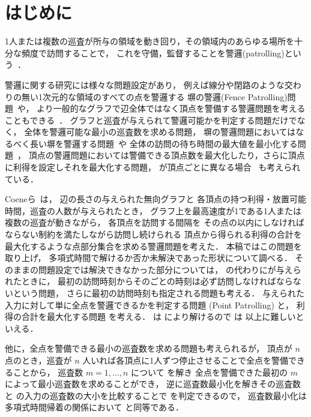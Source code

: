 
\section{はじめに}

1人または複数の巡査が所与の領域を動き回り，その領域内のあらゆる場所を十分な頻度で訪問することで，
これを守備，監督することを警邏(patrolling)という~\cite{czyzowicz2011boundary}．

警邏に関する研究には様々な問題設定があり，
例えば線分や閉路のような交わりの無い1次元的な領域のすべての点を警邏する
塀の警邏(Fence Patrolling)問題~\cite{czyzowicz2011boundary, chen2013fence}や，
より一般的なグラフで辺全体ではなく頂点を警備する警邏問題を考えることもできる~\cite{coene2011charlemagne}．
グラフと巡査が与えられて警邏可能かを判定する問題だけでなく，
全体を警邏可能な最小の巡査数を求める問題，
塀の警邏問題においてはなるべく長い塀を警邏する問題~\cite{czyzowicz2011boundary}や
全体の訪問の待ち時間の最大値を最小化する問題~\cite{chen2013fence}，
頂点の警邏問題においては警備できる頂点数を最大化したり，さらに頂点に利得を設定しそれを最大化する問題，
{\timelimit}が頂点ごとに異なる場合~\cite{coene2011charlemagne}
も考えられている．

Coeneら~\cite{coene2011charlemagne}は，
辺の長さの与えられた無向グラフと
各頂点の持つ利得・放置可能時間，巡査の人数が与えられたとき，
グラフ上を最高速度が1である1人または複数の巡査が動きながら，
各頂点を訪問する間隔を
その点の{\timelimit}以内にしなければならない制約を満たしながら訪問し続けられる
頂点から得られる利得の合計を最大化するような点部分集合を求める警邏問題を考えた．
本稿ではこの問題を取り上げ，
多項式時間で解けるか否か未解決であった形状について調べる．
そのままの問題設定では解決できなかった部分については，
{\timelimit}の代わりに{\period}が与えられたときに，
最初の訪問時刻からその{\period}ごとの時刻は必ず訪問しなければならないという問題，
さらに最初の訪問時刻も指定される問題も考える．
与えられた入力に対して単に全点を警邏できるかを判定する問題 \decisionpp (Point Patrolling) と，
利得の合計を最大化する問題 \optpp を考える．
\decisionpp は \optpp により解けるので \optpp は \decisionpp 以上に難しいといえる．

他に，全点を警備できる最小の巡査数を求める問題も考えられるが，
頂点が $n$ 点のとき，巡査が $n$ 人いれば各頂点に1人ずつ停止させることで全点を警備できることから，
巡査数 $m = 1, \ldots, n$ について \decisionpp を解き
全点を警備できた最初の $m$ によって最小巡査数を求めることができ，
逆に巡査数最小化を解きその巡査数と \decisionpp の入力の巡査数の大小を比較することで
\decisionpp を判定できるので，
巡査数最小化は多項式時間帰着の関係において \decisionpp と同等である．




